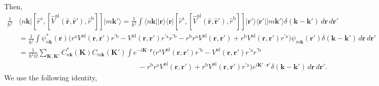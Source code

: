 Then,
\begin{align}\label{3.5}
\frac{1}{\hbar^{2}}&
\langle n\mathbf{k}\vert 
\left[
\hat{r}^{\mathrm{a}},
\left[
\hat{V}^\mathrm{nl}(\hat{\mathbf{r}},\hat{\mathbf{r}}'),\hat{r}^\mathrm{b}
\right]
\right]
\vert m\mathbf{k}'\rangle
= \frac{1}{\hbar^{2}}
\int \langle n\mathbf{k}\vert \vert\mathbf{r}\rangle\langle\mathbf{r}\vert 
\left[
\hat{r}^{\mathrm{a}},
\left[
\hat{V}^\mathrm{nl}(\hat{\mathbf{r}},\hat{\mathbf{r}}'),\hat{r}^\mathrm{b}
\right]
\right]
\vert\mathbf{r}'\rangle\langle\mathbf{r}'\vert \vert m\mathbf{k}'\rangle
\delta(\mathbf{k}-\mathbf{k}')\,d\mathbf{r}\,d\mathbf{r}'\nonumber\\
&= \frac{1}{\hbar^{2}}
\int \psi^{*}_{n\mathbf{k}}(\mathbf{r})
\Big(
  r^{\mathrm{a}}V^\mathrm{nl}(\mathbf{r},\mathbf{r}')r^{\prime\mathrm{b}}
- V^\mathrm{nl}(\mathbf{r},\mathbf{r}')r^{\prime\mathrm{a}}r^{\prime\mathrm{b}}
- r^\mathrm{b}r^{\mathrm{a}}V^\mathrm{nl}(\mathbf{r},\mathbf{r}')
+ r^\mathrm{b}V^\mathrm{nl}(\mathbf{r},\mathbf{r}')r^{\prime\mathrm{a}}
\Big)
\psi_{m\mathbf{k}}(\mathbf{r}')
\delta(\mathbf{k}-\mathbf{k}')\,d\mathbf{r}\,d\mathbf{r}'\nonumber\\
&= \frac{1}{\hbar^{2}\Omega}
\sum_{\mathbf{K},\mathbf{K}'}
C^{*}_{n\mathbf{k}}(\mathbf{K})C_{m\mathbf{k}}(\mathbf{K}')
\int e^{-i\mathbf{K}\cdot\mathbf{r}}
\Big(
  r^{\mathrm{a}}V^\mathrm{nl}(\mathbf{r},\mathbf{r}')r^{\prime\mathrm{b}}
- V^\mathrm{nl}(\mathbf{r},\mathbf{r}')r^{\prime\mathrm{a}}r^{\prime\mathrm{b}}
\nonumber\\
&\hspace{7cm} -
  r^\mathrm{b}r^{\mathrm{a}}V^\mathrm{nl}(\mathbf{r},\mathbf{r}')
+ r^\mathrm{b}V^\mathrm{nl}(\mathbf{r},\mathbf{r}')r^{\prime\mathrm{a}}
\Big) 
e^{i\mathbf{K}'\cdot\mathbf{r}'}
\delta(\mathbf{k}-\mathbf{k}')\,d\mathbf{r}\,d\mathbf{r}'.
\end{align} 
We use the following identity,
